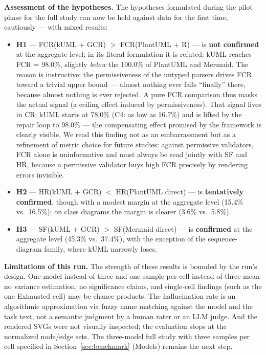 \documentclass[acmsmall,nonacm]{acmart}
\begin{document}
\textbf{Assessment of the hypotheses.} The hypotheses formulated during the pilot phase for the full study can now be held against data for the first time, cautiously --- with mixed results:

\begin{itemize}
  \item \textbf{H1} --- FCR(kUML + GCR) $>$ FCR(PlantUML + R) --- is \textbf{not confirmed} at the aggregate level; in its literal formulation it is refuted: kUML reaches FCR = 98.0\%, slightly \emph{below} the 100.0\% of PlantUML and Mermaid. The reason is instructive: the permissiveness of the untyped parsers drives FCR toward a trivial upper bound --- almost nothing ever fails ``finally'' there, because almost nothing is ever rejected. A pure FCR comparison thus masks the actual signal (a ceiling effect induced by permissiveness). That signal lives in CR: kUML starts at 78.0\% (C4: as low as 16.7\%) and is lifted by the repair loop to 98.0\% --- the compensating effect promised by the framework is clearly visible. We read this finding not as an embarrassment but as a refinement of metric choice for future studies: against permissive validators, FCR alone is uninformative and must always be read jointly with SF and HR, because a permissive validator buys high FCR precisely by rendering errors invisible.
  \item \textbf{H2} --- HR(kUML + GCR) $<$ HR(PlantUML direct) --- is \textbf{tentatively confirmed}, though with a modest margin at the aggregate level (15.4\% vs.\ 16.5\%); on class diagrams the margin is clearer (3.6\% vs.\ 5.8\%).
  \item \textbf{H3} --- SF(kUML + GCR) $>$ SF(Mermaid direct) --- is \textbf{confirmed} at the aggregate level (45.3\% vs.\ 37.4\%), with the exception of the sequence-diagram family, where kUML narrowly loses.
\end{itemize}

\textbf{Limitations of this run.} The strength of these results is bounded by the run's design. One model instead of three and one sample per cell instead of three mean no variance estimation, no significance claims, and single-cell findings (such as the one Exhausted cell) may be chance products. The hallucination rate is an algorithmic approximation via fuzzy name matching against the model and the task text, not a semantic judgment by a human rater or an LLM judge. And the rendered SVGs were not visually inspected; the evaluation stops at the normalized node/edge sets. The three-model full study with three samples per cell specified in Section~\ref{sec:benchmark} (Models) remains the next step.
\end{document}
